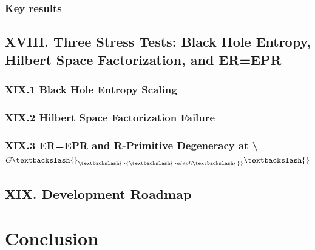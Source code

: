 \documentclass{article[11pt,letterpaper]}
\begin{document}

\subsubsection{Key results}
\label{sec:key-results}


\subsection{XVIII. Three Stress Tests: Black Hole Entropy, Hilbert Space Factorization, and ER=EPR}
\label{sec:xviii-three-stress-tests-black-hole-entropy-hilber}


\subsubsection{XIX.1 Black Hole Entropy Scaling}
\label{sec:xix1-black-hole-entropy-scaling}


\subsubsection{XIX.2 Hilbert Space Factorization Failure}
\label{sec:xix2-hilbert-space-factorization-failure}


\subsubsection{XIX.3 ER=EPR and R-Primitive Degeneracy at \textbackslash{}$G\textbackslash{}_\textbackslash{}{\textbackslash{}aleph\textbackslash{}}\textbackslash{}$}
\label{sec:xix3-erepr-and-r-primitive-degeneracy-at-galeph}


\subsection{XIX. Development Roadmap}
\label{sec:xix-development-roadmap}


\section{Conclusion}
\label{sec:conclusion}


% 
% 
\end{document}
